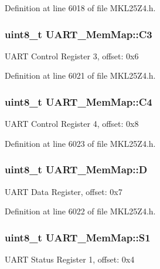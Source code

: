 Definition at line 6018 of file M\+K\+L25\+Z4.\+h.

\subsubsection[{\texorpdfstring{C3}{C3}}]{\setlength{\rightskip}{0pt plus 5cm}uint8\+\_\+t U\+A\+R\+T\+\_\+\+Mem\+Map\+::\+C3}\hypertarget{struct_u_a_r_t___mem_map_a2e3cebfbfb9d96766397a8a102b8c29c}{}\label{struct_u_a_r_t___mem_map_a2e3cebfbfb9d96766397a8a102b8c29c}
U\+A\+RT Control Register 3, offset\+: 0x6 

Definition at line 6021 of file M\+K\+L25\+Z4.\+h.

\subsubsection[{\texorpdfstring{C4}{C4}}]{\setlength{\rightskip}{0pt plus 5cm}uint8\+\_\+t U\+A\+R\+T\+\_\+\+Mem\+Map\+::\+C4}\hypertarget{struct_u_a_r_t___mem_map_a6f18d698404d3f130cab66610aa526de}{}\label{struct_u_a_r_t___mem_map_a6f18d698404d3f130cab66610aa526de}
U\+A\+RT Control Register 4, offset\+: 0x8 

Definition at line 6023 of file M\+K\+L25\+Z4.\+h.

\subsubsection[{\texorpdfstring{D}{D}}]{\setlength{\rightskip}{0pt plus 5cm}uint8\+\_\+t U\+A\+R\+T\+\_\+\+Mem\+Map\+::D}\hypertarget{struct_u_a_r_t___mem_map_a3568c1640bf7dc0e1214cddcea1e8f0c}{}\label{struct_u_a_r_t___mem_map_a3568c1640bf7dc0e1214cddcea1e8f0c}
U\+A\+RT Data Register, offset\+: 0x7 

Definition at line 6022 of file M\+K\+L25\+Z4.\+h.

\subsubsection[{\texorpdfstring{S1}{S1}}]{\setlength{\rightskip}{0pt plus 5cm}uint8\+\_\+t U\+A\+R\+T\+\_\+\+Mem\+Map\+::\+S1}\hypertarget{struct_u_a_r_t___mem_map_a7eb8df4e43194dbd9f1d9bd4ab742cca}{}\label{struct_u_a_r_t___mem_map_a7eb8df4e43194dbd9f1d9bd4ab742cca}
U\+A\+RT Status Register 1, offset\+: 0x4 

